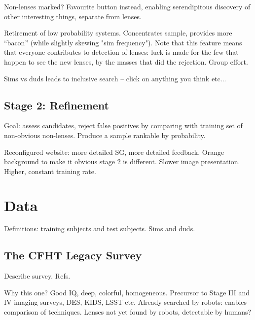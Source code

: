 \documentclass[useAMS,usenatbib,a4paper]{mn2e}
\begin{document}
Non-lenses marked? Favourite button instead, enabling serendipitous
discovery of other interesting things, separate from lenses.

Retirement of low probability systems. Concentrates sample, provides more
``bacon'' (while slightly skewing "sim frequency"). Note that this feature
means that everyone contributes to detection of lenses: luck is made for the
few that happen to see the new lenses, by the masses that did the rejection.
Group effort.

Sims vs duds leads to inclusive search -- click on anything you think etc...


\subsection{Stage 2: Refinement}
\label{sec:design:stage2}

Goal: assess candidates, reject false positives by comparing with training set
of non-obvious non-lenses. Produce a sample rankable by probability.

Reconfigured website: more detailed SG, more detailed feedback. Orange
background to make it obvious stage 2 is different. Slower image presentation.
Higher, constant training rate.


\section{Data}
\label{sec:data}

Definitions: training subjects and test subjects. Sims and duds.


\subsection{The CFHT Legacy Survey}
\label{sec:data:CFHTLS}

Describe survey. Refs. 

Why this one? Good IQ, deep, colorful, homogeneous. Precursor to Stage III and
IV imaging surveys, DES, KIDS, LSST etc. Already searched by robots: enables
comparison of techniques. Lenses not yet found by robots, detectable by
humans? 
\end{document}

